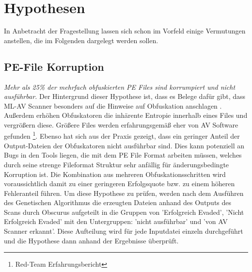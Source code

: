 
\section{Hypothesen}
\label{Sec:Hypothesen}
In Anbetracht der Fragestellung lassen sich schon im Vorfeld einige Vermutungen anstellen, die im Folgenden dargelegt werden sollen.
\subsection{PE-File Korruption} 
\textit{Mehr als 25\% der mehrfach obfuskierten PE Files sind korrumpiert und nicht ausführbar.} 
Der Hintergrund dieser Hypothese ist, dass es Belege dafür gibt, dass ML-AV Scanner besonders auf die Hinweise auf Obfuskation anschlagen \cite{nunes_2022_bane}. Außerdem erhöhen Obfuskatoren die inhärente Entropie innerhalb eines Files und vergrößern diese. Größere Files werden erfahrungsgemäß eher von AV Software gefunden \footnote{Red-Team Erfahrungsbericht}. Ebenso hat sich aus der Praxis gezeigt, dass ein geringer Anteil der Output-Dateien der Obfuskatoren nicht ausführbar sind.
Dies kann potenziell an Bugs in den Tools liegen, die mit dem PE File Format arbeiten müssen, welches durch seine strenge Fileformat Struktur sehr anfällig für änderungsbedingte Korruption ist. Die Kombination aus mehreren Obfuskationsschritten wird voraussichtlich damit zu einer geringeren Erfolgsquote bzw. zu einem höheren Fehleranteil führen.
Um diese Hypothese zu prüfen, werden nach dem Ausführen des Genetischen Algorithmus die erzeugten Dateien anhand des Outputs des Scans durch Obscurus aufgeteilt in die Gruppen von 'Erfolgreich Evaded', 'Nicht Erfolgreich Evaded' mit den Untergruppen: 'nicht ausführbar' und 'von AV Scanner erkannt'. Diese Aufteilung wird für jede Inputdatei einzeln durchgeführt und die Hypothese dann anhand der Ergebnisse überprüft.
